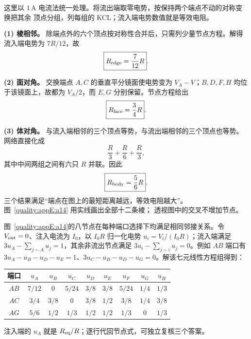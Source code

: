 \begin{xesolution}
这里以 $1\,\mathrm A$ 电流法统一处理。将流出端取零电势，按保持两个端点不动的对称变换把其余
顶点分组，列每组的 KCL；流入端电势数值就是等效电阻。

\textbf{(1) 棱相邻。}
除端点外的六个顶点按对称性合并后，只需列少量节点方程。解得流入端电势为
$7R/12$，故
\begin{equation}
  \boxed{R_{\rm edge}=\frac{7}{12}R}.
\end{equation}

\textbf{(2) 面对角。}
交换端点 $A,C$ 的垂直平分镜面使电势变为 $V_A-V$；$B,D,F,H$ 均位于该镜面上，故都为 $V_A/2$，而 $E,G$ 分别保留。节点方程给出
\begin{equation}
  \boxed{R_{\rm face}=\frac34R}.
\end{equation}

\textbf{(3) 体对角。}
与流入端相邻的三个顶点等势，与流出端相邻的三个顶点也等势。网络直接化成
\[
  \frac R3+\frac R6+\frac R3,
\]
其中中间两组之间有六只 $R$ 并联。因此
\begin{equation}
  \boxed{R_{\rm body}=\frac56R}.
\end{equation}
三个结果满足“端点在图上的最短距离越远，等效电阻越大”。图~\ref{quality:appE:a14} 用实线画出全部十二条棱；
透视图中的交叉不增加节点。


图~\ref{quality:appE:a14}的八节点在每种端口选择下均满足相同邻接关系。令 $V_{\rm out}=0$、注入电流为 $I_0$，以 $I_0R$ 归一化电势 $u_i=V_i/(I_0R)$；流入端满足 $3u_A-\sum_{j\sim A}u_j=1$，其余非流出节点满足 $3u_i-\sum_{j\sim i}u_j=0$。例如 $AB$ 端口有 $3u_A-u_B-u_D-u_E=1$、$3u_C-u_B-u_D-u_G=0$。解该七元线性方程组得到：\par\begin{center}\begin{tabular}{c|cccccccc}端口 & $u_A$ & $u_B$ & $u_C$ & $u_D$ & $u_E$ & $u_F$ & $u_G$ & $u_H$\\\hline $AB$ & $7/12$&$0$&$5/24$&$3/8$&$3/8$&$5/24$&$1/4$&$1/3$\\ $AC$ & $3/4$&$3/8$&$0$&$3/8$&$1/2$&$3/8$&$1/4$&$3/8$\\ $AG$ & $5/6$&$1/2$&$1/3$&$1/2$&$1/2$&$1/3$&$0$&$1/3$\end{tabular}\end{center}注入端的 $u_A$ 就是 $R_{\rm eq}/R$；逐行代回节点式，可独立复核三个答案。
\end{xesolution}

